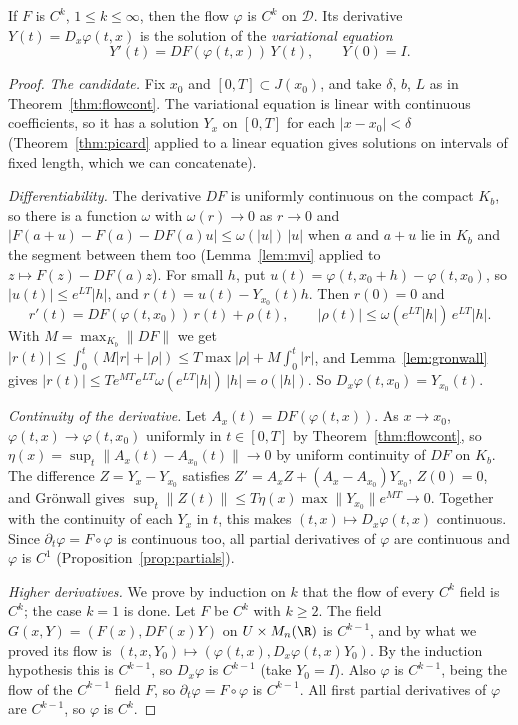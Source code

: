 \begin{theorem}\label{thm:flowsmooth}
If $F$ is $C^k$, $1\le k\le\infty$, then the flow $\varphi$ is $C^k$ on $\mathcal D$. Its derivative $Y(t)=D_x\varphi(t,x)$ is the solution of the
\emph{variational equation}
\[
Y'(t)=DF(\varphi(t,x))\,Y(t),\qquad Y(0)=I.
\]
\end{theorem}
\begin{proof}
\emph{The candidate.} Fix $x_0$ and $[0,T]\subset J(x_0)$, and take $\delta$, $b$, $L$ as in Theorem~\ref{thm:flowcont}. The variational equation is linear
with continuous coefficients, so it has a solution $Y_{x}$ on $[0,T]$ for each $|x-x_0|<\delta$ (Theorem~\ref{thm:picard} applied to a linear equation
gives solutions on intervals of fixed length, which we can concatenate).

\emph{Differentiability.} The derivative $DF$ is uniformly continuous on the compact $K_b$, so there is a function $\omega$ with $\omega(r)\to0$ as $r\to0$
and $|F(a+u)-F(a)-DF(a)u|\le\omega(|u|)\,|u|$ when $a$ and $a+u$ lie in $K_b$ and the segment between them too (Lemma~\ref{lem:mvi} applied to
$z\mapsto F(z)-DF(a)z$). For small $h$, put $u(t)=\varphi(t,x_0+h)-\varphi(t,x_0)$, so $|u(t)|\le e^{LT}|h|$, and $r(t)=u(t)-Y_{x_0}(t)h$. Then $r(0)=0$ and
\[
r'(t)=DF(\varphi(t,x_0))\,r(t)+\rho(t),\qquad|\rho(t)|\le\omega(e^{LT}|h|)\,e^{LT}|h|.
\]
With $M=\max_{K_b}\|DF\|$ we get $|r(t)|\le\int_0^t(M|r|+|\rho|)\le T\max|\rho|+M\int_0^t|r|$, and Lemma~\ref{lem:gronwall} gives
$|r(t)|\le Te^{MT}e^{LT}\omega(e^{LT}|h|)\,|h|=o(|h|)$. So $D_x\varphi(t,x_0)=Y_{x_0}(t)$.

\emph{Continuity of the derivative.} Let $A_x(t)=DF(\varphi(t,x))$. As $x\to x_0$, $\varphi(t,x)\to\varphi(t,x_0)$ uniformly in $t\in[0,T]$ by
Theorem~\ref{thm:flowcont}, so $\eta(x)=\sup_t\|A_x(t)-A_{x_0}(t)\|\to0$ by uniform continuity of $DF$ on $K_b$. The difference $Z=Y_x-Y_{x_0}$ satisfies
$Z'=A_xZ+(A_x-A_{x_0})Y_{x_0}$, $Z(0)=0$, and Gr\"onwall gives $\sup_t\|Z(t)\|\le T\eta(x)\max\|Y_{x_0}\|e^{MT}\to0$. Together with the continuity of each
$Y_x$ in $t$, this makes $(t,x)\mapsto D_x\varphi(t,x)$ continuous. Since $\partial_t\varphi=F\circ\varphi$ is continuous too, all partial derivatives of
$\varphi$ are continuous and $\varphi$ is $C^1$ (Proposition~\ref{prop:partials}).

\emph{Higher derivatives.} We prove by induction on $k$ that the flow of every $C^k$ field is $C^k$; the case $k=1$ is done. Let $F$ be $C^k$ with
$k\ge2$. The field $G(x,Y)=(F(x),DF(x)Y)$ on $U\times M_n(\R)$ is $C^{k-1}$, and by what we proved its flow is
$(t,x,Y_0)\mapsto(\varphi(t,x),D_x\varphi(t,x)Y_0)$. By the induction hypothesis this is $C^{k-1}$, so $D_x\varphi$ is $C^{k-1}$ (take $Y_0=I$). Also
$\varphi$ is $C^{k-1}$, being the flow of the $C^{k-1}$ field $F$, so $\partial_t\varphi=F\circ\varphi$ is $C^{k-1}$. All first partial derivatives of $\varphi$
are $C^{k-1}$, so $\varphi$ is $C^k$.
\end{proof}

